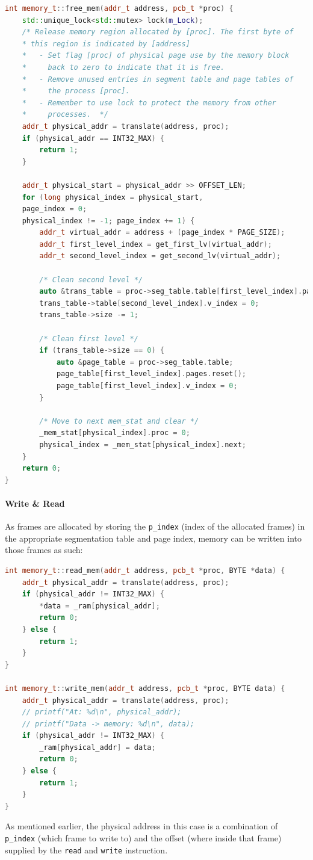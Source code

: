 \documentclass[]{article}
\begin{document}
\begin{lstlisting}[language=C++]
int memory_t::free_mem(addr_t address, pcb_t *proc) {
	std::unique_lock<std::mutex> lock(m_Lock);
	/* Release memory region allocated by [proc]. The first byte of
	* this region is indicated by [address]
	* 	- Set flag [proc] of physical page use by the memory block
	* 	  back to zero to indicate that it is free.
	* 	- Remove unused entries in segment table and page tables of
	* 	  the process [proc].
	* 	- Remember to use lock to protect the memory from other
	* 	  processes.  */
	addr_t physical_addr = translate(address, proc);
	if (physical_addr == INT32_MAX) {
		return 1;
	}
	
	addr_t physical_start = physical_addr >> OFFSET_LEN;
	for (long physical_index = physical_start,
	page_index = 0;
	physical_index != -1; page_index += 1) {
		addr_t virtual_addr = address + (page_index * PAGE_SIZE);
		addr_t first_level_index = get_first_lv(virtual_addr);
		addr_t second_level_index = get_second_lv(virtual_addr);
		
		/* Clean second level */
		auto &trans_table = proc->seg_table.table[first_level_index].pages;
		trans_table->table[second_level_index].v_index = 0;
		trans_table->size -= 1;
		
		/* Clean first level */
		if (trans_table->size == 0) {
			auto &page_table = proc->seg_table.table;
			page_table[first_level_index].pages.reset();
			page_table[first_level_index].v_index = 0;
		}
		
		/* Move to next mem_stat and clear */
		_mem_stat[physical_index].proc = 0;
		physical_index = _mem_stat[physical_index].next;
	}
	return 0;
}
\end{lstlisting}
\paragraph{Write \& Read}
As frames are allocated by storing the \lstinline|p_index| (index of the allocated frames) in the appropriate segmentation table and page index, memory can be written into those frames as such:
\begin{lstlisting}[language=C++]
int memory_t::read_mem(addr_t address, pcb_t *proc, BYTE *data) {
	addr_t physical_addr = translate(address, proc);
	if (physical_addr != INT32_MAX) {
		*data = _ram[physical_addr];
		return 0;
	} else {
		return 1;
	}
}

int memory_t::write_mem(addr_t address, pcb_t *proc, BYTE data) {
	addr_t physical_addr = translate(address, proc);
	// printf("At: %d\n", physical_addr);
	// printf("Data -> memory: %d\n", data);
	if (physical_addr != INT32_MAX) {
		_ram[physical_addr] = data;
		return 0;
	} else {
		return 1;
	}
}
\end{lstlisting}
As mentioned earlier, the physical address in this case is a combination of \lstinline|p_index| (which frame to write to) and the offset (where inside that frame) supplied by the \lstinline|read| and \lstinline|write| instruction.
\end{document}
